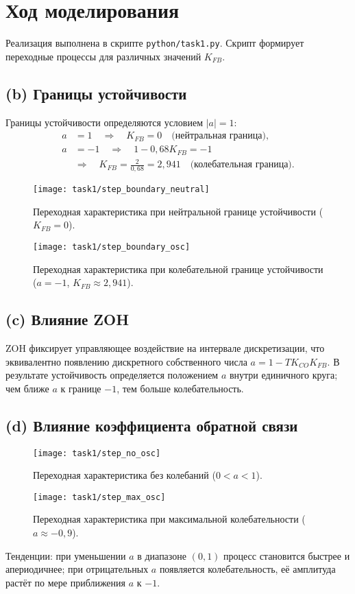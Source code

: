 \section{Ход моделирования}
Реализация выполнена в скрипте \texttt{python/task1.py}. Скрипт формирует переходные процессы для различных значений \(K_{FB}\).

\subsection*{(b) Границы устойчивости}
Границы устойчивости определяются условием \(|a| = 1\):
\begin{align}
  a &= 1 \quad \Rightarrow \quad K_{FB} = 0 \quad \text{(нейтральная граница)}, \\
  a &= -1 \quad \Rightarrow \quad 1 - 0{,}68 K_{FB} = -1 \\
  &\Rightarrow \quad K_{FB} = \frac{2}{0{,}68} = 2{,}941 \quad \text{(колебательная граница)}.
\end{align}
\begin{figure}[H]
  \centering
  \texttt{[image: task1/step\_boundary\_neutral]}
  \caption{Переходная характеристика при нейтральной границе устойчивости (\(K_{FB}=0\)).}
  \label{fig:task1_neutral}
\end{figure}
\begin{figure}[H]
  \centering
  \texttt{[image: task1/step\_boundary\_osc]}
  \caption{Переходная характеристика при колебательной границе устойчивости (\(a=-1\), \(K_{FB}\approx2{,}941\)).}
  \label{fig:task1_osc}
\end{figure}

\subsection*{(c) Влияние ZOH}
ZOH фиксирует управляющее воздействие на интервале дискретизации, что эквивалентно появлению дискретного собственного числа \(a=1-TK_{CO}K_{FB}\). В результате устойчивость определяется положением \(a\) внутри единичного круга; чем ближе \(a\) к границе \(-1\), тем больше колебательность.

\subsection*{(d) Влияние коэффициента обратной связи}
\begin{figure}[H]
  \centering
  \texttt{[image: task1/step\_no\_osc]}
  \caption{Переходная характеристика без колебаний (\(0<a<1\)).}
  \label{fig:task1_no_osc}
\end{figure}
\begin{figure}[H]
  \centering
  \texttt{[image: task1/step\_max\_osc]}
  \caption{Переходная характеристика при максимальной колебательности (\(a\approx-0{,}9\)).}
  \label{fig:task1_max_osc}
\end{figure}
Тенденции: при уменьшении \(a\) в диапазоне \((0,1)\) процесс становится быстрее и апериодичнее; при отрицательных \(a\) появляется колебательность, её амплитуда растёт по мере приближения \(a\) к \(-1\).

